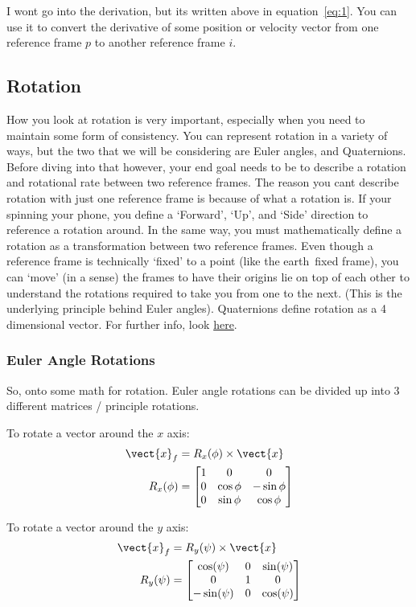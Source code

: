 \documentclass{report}
\begin{document}
I wont go into the derivation, but its written above in equation{~}\ref{eq:1}. You can use it  to convert the derivative of some position or velocity vector from one reference frame $p$ to another reference frame $i$.
\subsection{Rotation}
How you look at rotation is very important, especially when you need to maintain some form of consistency. You can represent rotation in a variety of ways, but the two that we will be considering are Euler angles, and Quaternions. Before diving into that however, your end goal needs to be to describe a rotation and rotational rate between two reference frames. The reason you cant describe rotation with just one reference frame is because of what a rotation is. If your spinning your phone, you define a `Forward', `Up', and `Side' direction to reference a rotation around. In the same way, you must mathematically define a rotation as a transformation between two reference frames. Even though a reference frame is technically `fixed' to a point (like the earth{~}fixed frame), you can `move' (in a sense) the frames to have their origins lie on top of each other to understand the rotations required to take you from one to the next. (This is the underlying principle behind Euler angles). Quaternions define rotation as a 4 dimensional vector. For further info, look \href{https://en.wikipedia.org/wiki/Quaternion}{here}.
\subsubsection{Euler Angle Rotations}
So, onto some math for rotation. Euler angle rotations can be divided up into 3 different matrices / principle rotations. 

To rotate a vector around the ${x}$ axis:
\begin{equation} \label{eq:2}
\begin{split}
\vect{x}_f &= R_x(\phi) \times \vect{x} \\
R_{x}(\phi) &= \begin{bmatrix}
    1 & 0 & 0\\
    0 & \cos{\phi} & -\sin{\phi}\\
    0 & \sin{\phi} & \cos{\phi}
\end{bmatrix}
\end{split}
\end{equation}

To rotate a vector around the ${y}$ axis:
\begin{equation} \label{eq:3}
\begin{split}
\vect{x}_f &= R_y(\psi) \times \vect{x} \\
R_y(\psi) &= \begin{bmatrix}
\cos(\psi) & 0 & \sin(\psi) \\
0 & 1 & 0 \\
-\sin(\psi) & 0 & \cos(\psi)
\end{bmatrix}
\end{split}
\end{equation}
\end{document}
